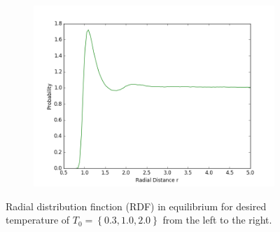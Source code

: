 \begin{figure}[ht]
\begin{subfigure}{0.3\textwidth}
\includegraphics[width=\textwidth]{fig/meanRDF_T2d0.png}
\end{subfigure}
\caption{Radial distribution finction (RDF) in equilibrium for desired temperature of $T_0=\left\lbrace 0.3,1.0,2.0\right\rbrace$ from the left to the right.} 
\label{9plotrdf}
\end{figure}


